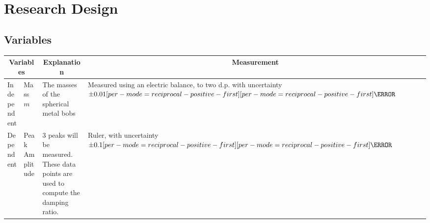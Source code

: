 \documentclass[a4paper,12pt]{article}
\let\oldsi\si
\renewcommand{\si}[1]{\oldsi[per-mode=reciprocal-positive-first]{#1}}
\newcommand{\thcolor}{\cellcolor{Blue!25}}
\begin{document}
\section{Research Design}

\subsection{Variables}

\begin{center}
  \begin{tabular}{|p{}|p{}|p{}|p{}|}
    \hline
    \multicolumn{2}{|c}{\thcolor Variables} & \multicolumn{1}{|c}{\thcolor Explanation} & \multicolumn{1}{|c|}{\thcolor Measurement}                                                                                                                                \\  \hline
    Independent                             & Mass $m$                                  & The masses of the spherical metal bobs                                              & Measured using an electric balance, to two d.p. with uncertainty $\pm 0.01 \si{\g}$ \\
    \hline
    Dependent                               & Peak Amplitude                            & 3 peaks will  be measured. These data points are used to compute the damping ratio. & Ruler, with uncertainty $\pm 0.1\si{\cm}$                                           \\
    \hline
  \end{tabular}
  \label{tab:1}
\end{center}
\end{document}
